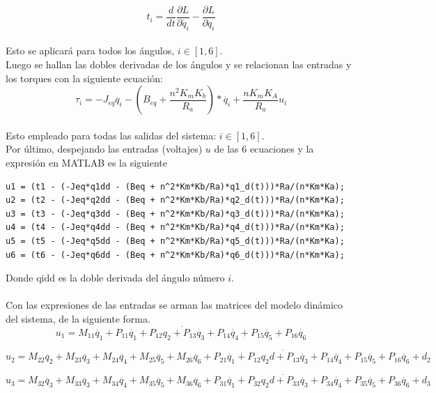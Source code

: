 \documentclass[conference]{IEEEtran}
\begin{document}
$$t_i = \frac{d}{dt}\frac{\partial L }{\partial \dot{q_i}} - \frac{\partial L}{\partial q_i}$$\\

Esto se aplicará para todos los ángulos, $i \in [1,6]$.\\
Luego se hallan las dobles derivadas de los ángulos y se relacionan las entradas y los torques con la siguiente ecuación:
$$\tau_i = -J_{eq}\ddot{q_i} - (B_{eq} + \frac{n^2K_m K_b}{R_a})*\dot{q_i} + \frac{n K_m K_A}{R_a} u_i$$\\
\newpage
\onecolumn
Esto empleado para todas las salidas del sistema: $i \in [1,6]$.\\
Por último, despejando las entradas (voltajes) $u$ de las 6 ecuaciones y la expresión en MATLAB es la siguiente
\begin{lstlisting}
u1 = (t1 - (-Jeq*q1dd - (Beq + n^2*Km*Kb/Ra)*q1_d(t)))*Ra/(n*Km*Ka);
u2 = (t2 - (-Jeq*q2dd - (Beq + n^2*Km*Kb/Ra)*q2_d(t)))*Ra/(n*Km*Ka);
u3 = (t3 - (-Jeq*q3dd - (Beq + n^2*Km*Kb/Ra)*q3_d(t)))*Ra/(n*Km*Ka);
u4 = (t4 - (-Jeq*q4dd - (Beq + n^2*Km*Kb/Ra)*q4_d(t)))*Ra/(n*Km*Ka);
u5 = (t5 - (-Jeq*q5dd - (Beq + n^2*Km*Kb/Ra)*q5_d(t)))*Ra/(n*Km*Ka);
u6 = (t6 - (-Jeq*q6dd - (Beq + n^2*Km*Kb/Ra)*q6_d(t)))*Ra/(n*Km*Ka);
\end{lstlisting}
Donde qidd es la doble derivada del ángulo número $i$.\\
\\

Con las expresiones de las entradas se arman las matrices del modelo dinámico del sistema, de la siguiente forma.
\begin{equation}
    u_1 = M_{11}\ddot{q_1} + P_{11}\dot{q_1} + P_{12}\dot{q_2 + P_{13}\dot{q_3}} + P_{14}\dot{q_4} + P_{15}\dot{q_5} + P_{16}\dot{q_6}
\end{equation}

\begin{equation}
    u_2 = M_{22}\ddot{q_2} + M_{23}\ddot{q_3} + M_{24}\ddot{q_4} + M_{25}\ddot{q_5} + M_{26}\ddot{q_6}+ P_{21}\dot{q_1} + P_{12}\dot{q_2d + P_{13}\dot{q_3}} + P_{14}\dot{q_4} + P_{15}\dot{q_5} + P_{16}\dot{q_6} + d_{2}
\end{equation}

\begin{equation}
    u_3 = M_{32}\ddot{q_3} + M_{33}\ddot{q_3} + M_{34}\ddot{q_4} + M_{35}\ddot{q_5} + M_{36}\ddot{q_6}+ P_{31}\dot{q_1} + P_{32}\dot{q_2d + P_{33}\dot{q_3}} + P_{34}\dot{q_4} + P_{35}\dot{q_5} + P_{36}\dot{q_6} +
    d_{3}    
\end{equation}
\end{document}
